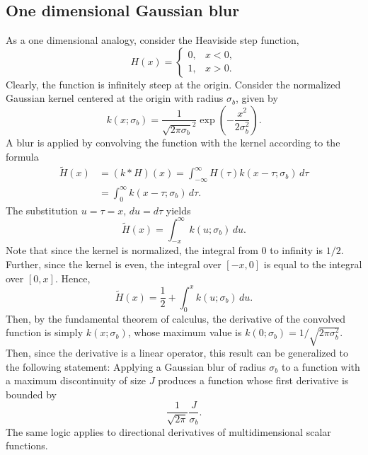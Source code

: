 \subsection{One dimensional Gaussian blur}
As a one dimensional analogy, consider the Heaviside step function,
\begin{equation*}
  H(x) = \begin{cases}
    0, & x < 0, \\
    1, & x > 0.
  \end{cases}
\end{equation*}
Clearly, the function is infinitely steep at the origin.
Consider the normalized Gaussian kernel centered at the origin with radius $\sigma_b$, given by
\begin{equation}
  k(x;\sigma_b) = \frac{1}{\sqrt{2\pi\sigma_b}^2} \exp\left({-\frac{x^2}{2\sigma_b^2}}\right).
\end{equation}
A blur is applied by convolving the function with the kernel according to the formula
\begin{align*}
  \tilde{H}(x) &= (k*H)(x) = \int_{-\infty}^{\infty}H(\tau)k(x-\tau;\sigma_b)\, d\tau \\
  &= \int_{0}^{\infty}k(x-\tau;\sigma_b)\, d\tau.
\end{align*}
The substitution $u=\tau=x,\, du=d\tau$ yields
\begin{equation*}
  \tilde{H}(x) = \int_{-x}^\infty k(u;\sigma_b)\, du.
\end{equation*}
Note that since the kernel is normalized, the integral from 0 to infinity is $1/2$.
Further, since the kernel is even, the integral over $[-x, 0]$ is equal to the integral over $[0, x]$.
Hence,
\begin{equation*}
  \tilde{H}(x) = \frac{1}{2} + \int_{0}^x k(u;\sigma_b)\, du.
\end{equation*}
Then, by the fundamental theorem of calculus, the derivative of the convolved function is simply $k(x;\sigma_b)$, whose maximum value is $k(0;\sigma_b) = 1/\sqrt{2\pi\sigma_b^2}$.
Then, since the derivative is a linear operator, this result can be generalized to the following statement:
Applying a Gaussian blur of radius $\sigma_b$ to a function with a maximum discontinuity of size $J$ produces a function whose first derivative is bounded by
\begin{equation*}
  \frac{1}{\sqrt{2\pi}}\frac{J}{\sigma_b}.
\end{equation*}
The same logic applies to directional derivatives of multidimensional scalar functions.

